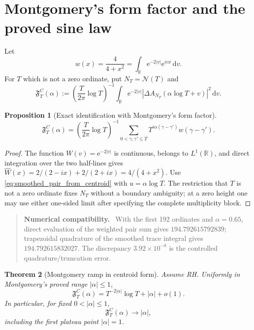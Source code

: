 \documentclass[11pt]{amsart}
\newtheorem{theorem}{Theorem}[section]
\newtheorem{proposition}[theorem]{Proposition}
\theoremstyle{definition}
\theoremstyle{remark}
\newcommand{\dd}{\,\mathrm d}
\newcommand{\ee}{\mathrm e}
\newenvironment{numericalcheck}
{\begin{quote}\small\noindent\textbf{Numerical compatibility.}\ }{\end{quote}}
\begin{document}
\section{Montgomery's form factor and the proved sine law}

Let
\begin{equation}\label{eq:montgomery_weight}
w(x)=\frac4{4+x^2}
=\int_{\mathbb R}\ee^{-2|v|}\ee^{ivx}\dd v.
\end{equation}
For $T$ which is not a zero ordinate, put $N_T=\mathcal N(T)$ and
\begin{equation}\label{eq:centroid_form_factor}
\mathfrak F_T^C(\alpha)
:=\left(\frac{T}{2\pi}\log T\right)^{-1}
\int_{\mathbb R}\ee^{-2|v|}
|\Delta A_{N_T}(\alpha\log T+v)|^2\dd v.
\end{equation}

\begin{proposition}[Exact identification with Montgomery's form factor]
\label{prop:Montgomery_identity}
\begin{equation}\label{eq:Montgomery_identity}
\boxed{
\mathfrak F_T^C(\alpha)
=\left(\frac{T}{2\pi}\log T\right)^{-1}
\sum_{0<\gamma,\gamma'\leq T}
T^{i\alpha(\gamma-\gamma')}w(\gamma-\gamma').}
\end{equation}
\end{proposition}

\begin{proof}
The function $W(v)=\ee^{-2|v|}$ is continuous, belongs to $L^1(\mathbb R)$,
and direct integration over the two half-lines gives
$\widehat W(x)=2/(2-ix)+2/(2+ix)=4/(4+x^2)$.  Use
\eqref{eq:smoothed_pair_from_centroid} with $u=\alpha\log T$.  The restriction
that $T$ is not a zero ordinate fixes $N_T$ without a boundary ambiguity; at a
zero height one may use either one-sided limit after specifying the complete
multiplicity block.
\end{proof}

\begin{numericalcheck}
With the first 192 ordinates and $\alpha=0.65$, direct evaluation of the
weighted pair sum gives $194.792615792839$; trapezoidal quadrature of the
smoothed trace integral gives $194.792615832027$.  The discrepancy
$3.92\times10^{-8}$ is the controlled quadrature/truncation error.
\end{numericalcheck}

\begin{theorem}[Montgomery ramp in centroid form]\label{thm:ramp}
Assume RH.  Uniformly in Montgomery's proved range $|\alpha|\leq1$,
\begin{equation}\label{eq:ramp_asymptotic}
\mathfrak F_T^C(\alpha)
=T^{-2|\alpha|}\log T+|\alpha|+o(1).
\end{equation}
In particular, for fixed $0<|\alpha|\leq1$,
\begin{equation}\label{eq:ramp_limit}
\mathfrak F_T^C(\alpha)\longrightarrow|\alpha|,
\end{equation}
including the first plateau point $|\alpha|=1$.
\end{theorem}
\end{document}
